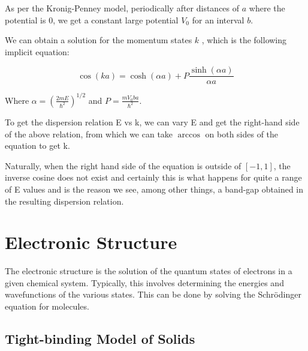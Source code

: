 As per the Kronig-Penney model, periodically after distances of $a$ where the potential is 0, we get a constant large potential $V_0$ for an interval $b$.

We can obtain a solution for the momentum states $k$ \cite{ashcroft2022solid}, which is the following implicit equation:

\begin{equation}
\cos(ka) = \cosh(\alpha a) + P \frac{\sinh(\alpha a)}{\alpha a}
\end{equation}

Where $\alpha = (\frac{2mE}{\hbar^2})^{1/2}$ and $P = \frac{mV_0 ba}{\hbar^2}$.

To get the dispersion relation E vs k, we can vary E and get the right-hand side of the above relation, from which we can take $\arccos$ on both sides of the equation to get k. 


Naturally, when the right hand side of the equation is outside of $[-1, 1]$, the inverse cosine does not exist and certainly this is what happens for quite a range of E values and is the reason we see, among other things, a band-gap obtained in the resulting dispersion relation.













\section{Electronic Structure}

The electronic structure is the solution of the quantum states of electrons in a given chemical system. Typically, this involves determining the energies and wavefunctions of the various states. This can be done by solving the Schr{\"o}dinger equation for molecules.


\subsection{Tight-binding Model of Solids}

